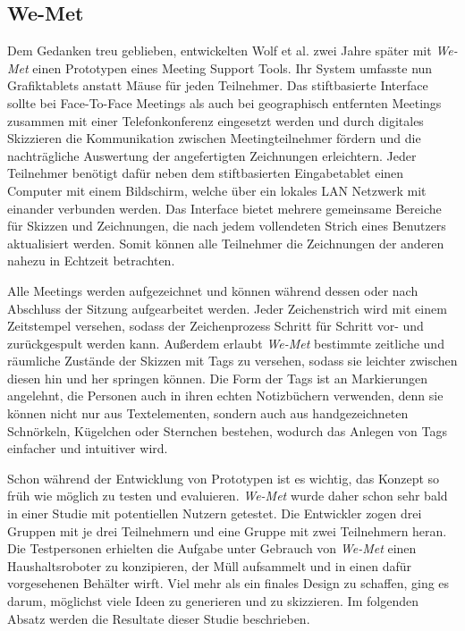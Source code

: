 \subsection{We-Met} 
Dem Gedanken treu geblieben, entwickelten Wolf et al. zwei Jahre später mit \emph{We-Met} \citep{Wolf:1997p75} einen Prototypen eines Meeting Support Tools. Ihr System umfasste nun Grafiktablets anstatt Mäuse für jeden Teilnehmer. Das stiftbasierte Interface sollte bei Face-To-Face Meetings als auch bei geographisch entfernten Meetings zusammen mit einer Telefonkonferenz eingesetzt werden und durch digitales Skizzieren die Kommunikation zwischen Meetingteilnehmer fördern und die nachträgliche Auswertung der angefertigten Zeichnungen erleichtern. Jeder Teilnehmer benötigt dafür neben dem stiftbasierten Eingabetablet einen Computer mit einem Bildschirm, welche über ein lokales LAN Netzwerk mit einander verbunden werden. Das Interface bietet mehrere gemeinsame Bereiche für Skizzen und Zeichnungen, die nach jedem vollendeten Strich eines Benutzers aktualisiert werden. Somit können alle Teilnehmer die Zeichnungen der anderen nahezu in Echtzeit betrachten.

Alle Meetings werden aufgezeichnet und können während dessen oder nach Abschluss der Sitzung aufgearbeitet werden. Jeder Zeichenstrich wird mit einem Zeitstempel versehen, sodass der Zeichenprozess Schritt für Schritt vor- und zurückgespult werden kann. Außerdem erlaubt \emph{We-Met} bestimmte zeitliche und räumliche Zustände der Skizzen mit Tags zu versehen, sodass sie leichter zwischen diesen hin und her springen können. Die Form der Tags ist an Markierungen angelehnt, die Personen auch in ihren echten Notizbüchern verwenden, denn sie können nicht nur aus Textelementen, sondern auch aus handgezeichneten Schnörkeln, Kügelchen oder Sternchen bestehen, wodurch das Anlegen von Tags einfacher und intuitiver wird.

\medskip Schon während der Entwicklung von Prototypen ist es wichtig, das Konzept so früh wie möglich zu testen und evaluieren. \emph{We-Met} wurde daher schon sehr bald in einer Studie mit potentiellen Nutzern getestet. Die Entwickler zogen drei Gruppen mit je drei Teilnehmern und eine Gruppe mit zwei Teilnehmern heran. Die Testpersonen erhielten die Aufgabe unter Gebrauch von \emph{We-Met} einen Haushaltsroboter zu konzipieren, der Müll aufsammelt und in einen dafür vorgesehenen Behälter wirft. Viel mehr als ein finales Design zu schaffen, ging es darum, möglichst viele Ideen zu generieren und zu skizzieren. Im folgenden Absatz werden die Resultate dieser Studie beschrieben.

